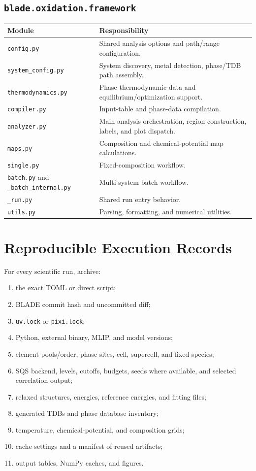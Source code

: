 \documentclass[11pt,letterpaper]{article}
\newcommand{\file}[1]{\nolinkurl{#1}}
\begin{document}
\subsection{\texttt{blade.oxidation.framework}}

\begin{longtable}{p{}p{}}
\toprule
Module & Responsibility \\
\midrule
\endhead
\file{config.py} & Shared analysis options and path/range configuration. \\
\file{system_config.py} & System discovery, metal detection, phase/TDB path assembly. \\
\file{thermodynamics.py} & Phase thermodynamic data and equilibrium/optimization support. \\
\file{compiler.py} & Input-table and phase-data compilation. \\
\file{analyzer.py} & Main analysis orchestration, region construction, labels, and plot dispatch. \\
\file{maps.py} & Composition and chemical-potential map calculations. \\
\file{single.py} & Fixed-composition workflow. \\
\file{batch.py} and \file{_batch_internal.py} & Multi-system batch workflow. \\
\file{_run.py} & Shared run entry behavior. \\
\file{utils.py} & Parsing, formatting, and numerical utilities. \\
\bottomrule
\end{longtable}

\section{Reproducible Execution Records}

For every scientific run, archive:
\begin{enumerate}
  \item the exact TOML or direct script;
  \item BLADE commit hash and uncommitted diff;
  \item \file{uv.lock} or \file{pixi.lock};
  \item Python, external binary, MLIP, and model versions;
  \item element pools/order, phase sites, cell, supercell, and fixed species;
  \item SQS backend, levels, cutoffs, budgets, seeds where available, and
  selected correlation output;
  \item relaxed structures, energies, reference energies, and fitting files;
  \item generated TDBs and phase database inventory;
  \item temperature, chemical-potential, and composition grids;
  \item cache settings and a manifest of reused artifacts;
  \item output tables, NumPy caches, and figures.
\end{enumerate}
\end{document}
